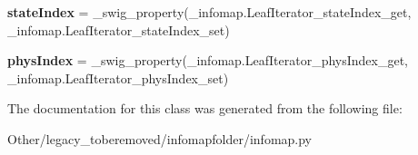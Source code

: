 \begin{DoxyCompactItemize}
\mbox{\label{classinfomapfolder_1_1infomap_1_1LeafIterator_a154a13d240633cac7b772a7fe2a196a0}} 
{\bfseries state\+Index} = \+\_\+swig\+\_\+property(\+\_\+infomap.\+Leaf\+Iterator\+\_\+state\+Index\+\_\+get, \+\_\+infomap.\+Leaf\+Iterator\+\_\+state\+Index\+\_\+set)
\item 
\mbox{\label{classinfomapfolder_1_1infomap_1_1LeafIterator_a3ccd8e2cc3df30e948103050593e3f25}} 
{\bfseries phys\+Index} = \+\_\+swig\+\_\+property(\+\_\+infomap.\+Leaf\+Iterator\+\_\+phys\+Index\+\_\+get, \+\_\+infomap.\+Leaf\+Iterator\+\_\+phys\+Index\+\_\+set)
\end{DoxyCompactItemize}


The documentation for this class was generated from the following file\+:\begin{DoxyCompactItemize}
\item 
Other/legacy\+\_\+toberemoved/infomapfolder/infomap.\+py\end{DoxyCompactItemize}
